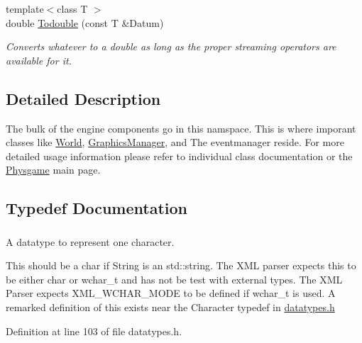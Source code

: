 \begin{DoxyCompactItemize}
{\footnotesize template$<$class T $>$ }\\double \hyperlink{namespacephys_aa89192e0bb495fdf141649f5abd88963}{Todouble} (const T \&Datum)
\begin{DoxyCompactList}\small\item\em Converts whatever to a double as long as the proper streaming operators are available for it. \item\end{DoxyCompactList}\end{DoxyCompactItemize}


\subsection{Detailed Description}
The bulk of the engine components go in this namspace. This is where imporant classes like \hyperlink{classphys_1_1World}{World}, \hyperlink{classphys_1_1GraphicsManager}{GraphicsManager}, and The eventmanager reside. For more detailed usage information please refer to individual class documentation or the \hyperlink{index}{Physgame} main page. 

\subsection{Typedef Documentation}
\hypertarget{namespacephys_a3098bae5b0a3cd16eec331f766cc562b}{
\subsubsection[{Character}]{}}
\label{df/dec/namespacephys_a3098bae5b0a3cd16eec331f766cc562b}


A datatype to represent one character. 

This should be a char if String is an std::string. The XML parser expects this to be either char or wchar\_\-t and has not be test with external types. The XML Parser expects XML\_\-WCHAR\_\-MODE to be defined if wchar\_\-t is used. A remarked definition of this exists near the Character typedef in \hyperlink{datatypes_8h_source}{datatypes.h} 

Definition at line 103 of file datatypes.h.

\hypertarget{namespacephys_a5ce5049f8b4bf88d6413c47b504ebb31}{
\subsubsection[{ConstString}]{}}
\label{df/dec/namespacephys_a5ce5049f8b4bf88d6413c47b504ebb31}


